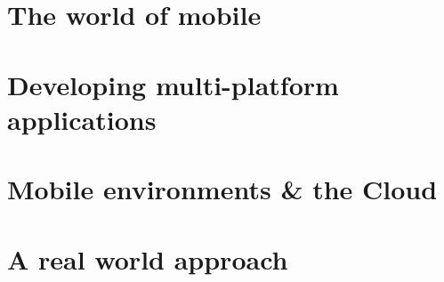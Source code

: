 \part{The world of mobile}




\cleardoublepage
{}
\part{Developing multi-platform applications}




\part{Mobile environments \& the Cloud}






\part{A real world approach}




\appendix
\cleardoublepage

\cleardoublepage
\cleardoublepage

